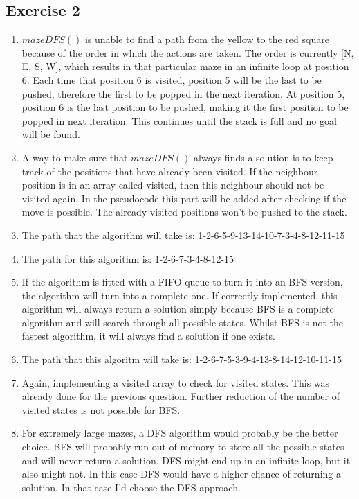 \documentclass{article}
\begin{document}
	\subsection*{Exercise 2}
	\begin{enumerate}
		\item $mazeDFS()$ is unable to find a path from the yellow to the red square because of the order in which the actions are taken. The order is currently [N, E, S, W], which results in that particular maze in an infinite loop at position 6. Each time that position 6 is visited, position 5 will be the last to be pushed, therefore the first to be popped in the next iteration. At position 5, position 6 is the last position to be pushed, making it the first position to be popped in next iteration. This continues until the stack is full and no goal will be found.
		
		\item A way to make sure that $mazeDFS()$ always finds a solution is to keep track of the positions that have already been visited. If the neighbour position is in an array called visited, then this neighbour should not be visited again. In the pseudocode this part will be added after checking if the move is possible. The already visited positions won't be pushed to the stack.
		
		\item The path that the algorithm will take is: 1-2-6-5-9-13-14-10-7-3-4-8-12-11-15
		
		\item The path for this algorithm is: 1-2-6-7-3-4-8-12-15
		
		\item If the algorithm is fitted with a FIFO queue to turn it into an BFS version, the algorithm will turn into a complete one. If correctly implemented, this algorithm will always return a solution simply because BFS is a complete algorithm and will search through all possible states. Whilst BFS is not the fastest algorithm, it will always find a solution if one exists. 
		
		\item The path that this algoritm will take is: 1-2-6-7-5-3-9-4-13-8-14-12-10-11-15
		
		\item Again, implementing a visited array to check for visited states. This was already done for the previous question. Further reduction of the number of visited states is not possible for BFS.
		
		\item For extremely large mazes, a DFS algorithm would probably be the better choice. BFS will probably run out of memory to store all the possible states and will never return a solution. DFS might end up in an infinite loop, but it also might not. In this case DFS would have a higher chance of returning a solution. In that case I'd choose the DFS approach.
	\end{enumerate}
	
\end{document}
